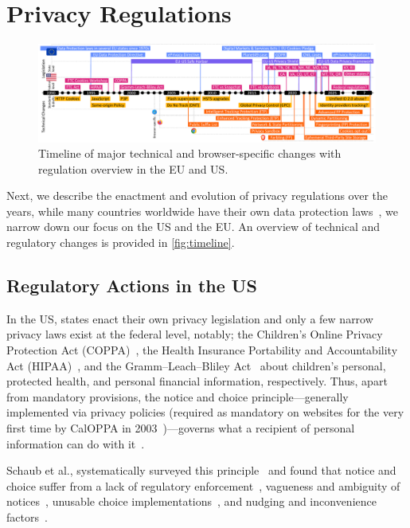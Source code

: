 \section{Privacy Regulations}
\label{sec:regulations}

\begin{figure}
    \centering
    \includegraphics[width=\textwidth]{figures/timeline.pdf}
    \caption{Timeline of major technical and browser-specific changes with regulation overview in the EU and US.}
    \label{fig:timeline}
\end{figure}

Next, we describe the enactment and evolution of privacy regulations over the years, while many countries worldwide have their own data protection laws~\cite{cnilDataProtectionWorld}, we narrow down our focus on the US and the EU. An overview of technical and regulatory changes is provided in \autoref{fig:timeline}.
\subsection{Regulatory Actions in the US}
\label{sec:us-regulations}

In the US, states enact their own privacy legislation and only a few narrow privacy laws exist at the federal level, notably; the Children’s Online Privacy Protection Act (COPPA)~\cite{ChildrensOnlinePrivacy2013}, the Health Insurance Portability and Accountability Act (HIPAA)~\cite{rightsocrHIPAAPrivacyRule2008}, and the Gramm–Leach–Bliley Act~\cite{GrammLeachBlileyAct2013} about children’s personal, protected health, and personal financial information, respectively. Thus, apart from mandatory provisions, the notice and choice principle---generally implemented via privacy policies (required as mandatory on websites for the very first time by CalOPPA in 2003~\cite{CaliforniaCodeBPC2003})---governs what a recipient of personal information can do with it~\cite{zimmeckInformationPrivacyLaw2013}.

Schaub et al., systematically surveyed this principle~\cite{schaubDesignSpaceEffective2015} and found that notice and choice suffer from a lack of regulatory enforcement~\cite{cranorNecessaryNotSufficient2012}, vagueness and ambiguity of notices~\cite{reidenbergAmbiguityPrivacyPolicies2016}, unusable choice implementations~\cite{habibItsScavengerHunt2020}, and nudging and inconvenience factors~\cite{oconnorUnclearInconspicuousRight2021}. 


